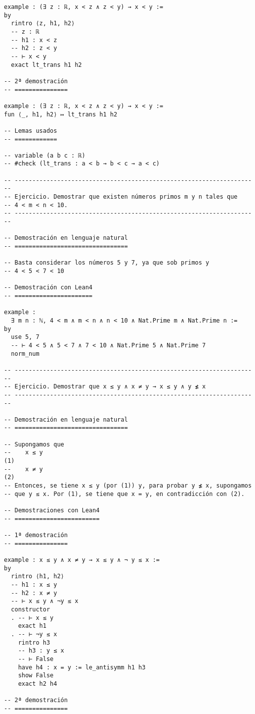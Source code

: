 \begin{verbatim}
example : (∃ z : ℝ, x < z ∧ z < y) → x < y :=
by
  rintro ⟨z, h1, h2⟩
  -- z : ℝ
  -- h1 : x < z
  -- h2 : z < y
  -- ⊢ x < y
  exact lt_trans h1 h2

-- 2ª demostración
-- ===============

example : (∃ z : ℝ, x < z ∧ z < y) → x < y :=
fun ⟨_, h1, h2⟩ ↦ lt_trans h1 h2

-- Lemas usados
-- ============

-- variable (a b c : ℝ)
-- #check (lt_trans : a < b → b < c → a < c)

-- ---------------------------------------------------------------------
-- Ejercicio. Demostrar que existen números primos m y n tales que
-- 4 < m < n < 10.
-- ---------------------------------------------------------------------

-- Demostración en lenguaje natural
-- ================================

-- Basta considerar los números 5 y 7, ya que sob primos y
-- 4 < 5 < 7 < 10

-- Demostración con Lean4
-- ======================

example :
  ∃ m n : ℕ, 4 < m ∧ m < n ∧ n < 10 ∧ Nat.Prime m ∧ Nat.Prime n :=
by
  use 5, 7
  -- ⊢ 4 < 5 ∧ 5 < 7 ∧ 7 < 10 ∧ Nat.Prime 5 ∧ Nat.Prime 7
  norm_num

-- ---------------------------------------------------------------------
-- Ejercicio. Demostrar que x ≤ y ∧ x ≠ y → x ≤ y ∧ y ≰ x
-- ---------------------------------------------------------------------

-- Demostración en lenguaje natural
-- ================================

-- Supongamos que
--    x ≤ y                                                          (1)
--    x ≠ y                                                          (2)
-- Entonces, se tiene x ≤ y (por (1)) y, para probar y ≰ x, supongamos
-- que y ≤ x. Por (1), se tiene que x = y, en contradicción con (2).

-- Demostraciones con Lean4
-- ========================

-- 1ª demostración
-- ===============

example : x ≤ y ∧ x ≠ y → x ≤ y ∧ ¬ y ≤ x :=
by
  rintro ⟨h1, h2⟩
  -- h1 : x ≤ y
  -- h2 : x ≠ y
  -- ⊢ x ≤ y ∧ ¬y ≤ x
  constructor
  . -- ⊢ x ≤ y
    exact h1
  . -- ⊢ ¬y ≤ x
    rintro h3
    -- h3 : y ≤ x
    -- ⊢ False
    have h4 : x = y := le_antisymm h1 h3
    show False
    exact h2 h4

-- 2ª demostración
-- ===============


\end{verbatim}
